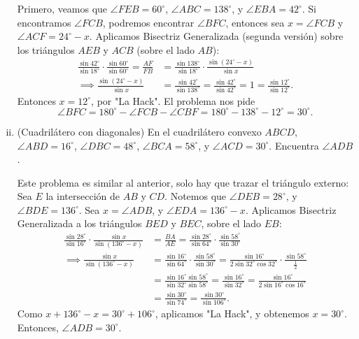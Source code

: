 \documentclass[11pt]{scrartcl}
\begin{document}
\begin{enumerate}[i)]
        \begin{soln} 
            Primero, veamos que $\angle FEB = 60^{\circ}$, $\angle ABC = 138^{\circ}$, y $\angle EBA = 42^{\circ}$. Si encontramos $\angle FCB$, podremos encontrar $\angle BFC$, entonces sea $x = \angle FCB$ y $\angle ACF = 24^{\circ}-x$. Aplicamos Bisectriz Generalizada (segunda versión) sobre los triángulos $AEB$ y $ACB$ (sobre el lado $AB$):
            \begin{align*}
                \frac{\sin 42^{\circ}}{\sin 18^{\circ}}\cdot\frac{\sin 60^{\circ}}{\sin 60^{\circ}}=\frac{AF}{FB}&=\frac{\sin 138^{\circ}}{\sin 18^{\circ}}\cdot\frac{\sin (24^{\circ}-x)}{\sin x}\\
                \implies \frac{\sin (24^{\circ}-x)}{\sin x} &= \frac{\sin 42^{\circ}}{\sin 138^{\circ}} = \frac{\sin 42^{\circ}}{\sin 42^{\circ}}=1=\frac{\sin 12^{\circ}}{\sin 12^{\circ}}.
            \end{align*}
            Entonces $x = 12^{\circ}$, por "La Hack". El problema nos pide
            \[\angle BFC = 180^{\circ}-\angle FCB - \angle CBF = 180^{\circ}-138^{\circ}-12^{\circ} = \boxed{30^{\circ}}.\]
        \end{soln}

        \item (Cuadrilátero con diagonales) En el cuadrilátero convexo $ABCD$, $\angle ABD = 16^{\circ}$, $\angle DBC = 48^{\circ}$, $\angle BCA = 58^{\circ}$, y $\angle ACD = 30^{\circ}$. Encuentra $\angle ADB$.

        \begin{soln}
            Este problema es similar al anterior, solo hay que trazar el triángulo externo: Sea $E$ la intersección de $AB$ y $CD$. Notemos que $\angle DEB = 28^{\circ}$, y $\angle BDE = 136^{\circ}$. Sea $x=\angle ADB$, y $\angle EDA = 136^{\circ}-x$. Aplicamos Bisectriz Generalizada a los triángulos $BED$ y $BEC$, sobre el lado $EB$:
            \begin{align*}
                \frac{\sin28^{\circ}}{\sin16^{\circ}}\cdot\frac{\sin x}{\sin (136^{\circ}-x)}&=\frac{BA}{AE} = \frac{\sin28^{\circ}}{\sin64^{\circ}}\cdot\frac{\sin58^{\circ}}{\sin30^{\circ}}\\
                \implies \frac{\sin x}{\sin (136^{\circ}-x)}&=\frac{\sin16^{\circ}}{\sin64^{\circ}}\cdot\frac{\sin58^{\circ}}{\sin30^{\circ}}=\frac{\sin16^{\circ}}{2\sin32^{\circ}\cos32^{\circ}}\cdot\frac{\sin58^{\circ}}{\frac12}\\
                &=\frac{\sin16^{\circ}\sin58^{\circ}}{\sin32^{\circ}\sin58^{\circ}}=\frac{\sin16^{\circ}}{\sin32^{\circ}}=\frac{\sin16^{\circ}}{2\sin16^{\circ}\cos16^{\circ}}\\
                &=\frac{\sin30^{\circ}}{\sin74^{\circ}}=\frac{\sin30^{\circ}}{\sin106^{\circ}}.
            \end{align*}
            Como $x+136^{\circ}-x=30^{\circ}+106^{\circ}$, aplicamos "La Hack", y obtenemos $x=30^{\circ}$. Entonces, $\angle ADB = 30^{\circ}$.
        \end{soln}
    \end{enumerate}
\end{document}
